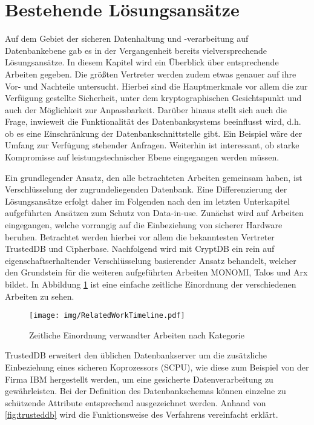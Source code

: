 \section{Bestehende Lösungsansätze}

Auf dem Gebiet der sicheren Datenhaltung und -verarbeitung auf Datenbankebene gab es in der Vergangenheit bereits vielversprechende Lösungsansätze. In diesem Kapitel wird ein Überblick über entsprechende Arbeiten gegeben. Die größten Vertreter werden zudem etwas genauer auf ihre Vor- und Nachteile untersucht. Hierbei sind die Hauptmerkmale vor allem die zur Verfügung gestellte Sicherheit, unter dem kryptographischen Gesichtspunkt und auch der Möglichkeit zur Anpassbarkeit. Darüber hinaus stellt sich auch die Frage, inwieweit die Funktionalität des Datenbanksystems beeinflusst wird, d.h. ob es eine Einschränkung der Datenbankschnittstelle gibt. Ein Beispiel wäre der Umfang zur Verfügung stehender Anfragen. Weiterhin ist interessant, ob starke Kompromisse auf leistungstechnischer Ebene eingegangen werden müssen.

Ein grundlegender Ansatz, den alle betrachteten Arbeiten gemeinsam haben, ist Verschlüsselung der zugrundeliegenden Datenbank. Eine Differenzierung der Lösungsansätze erfolgt daher im Folgenden nach den im letzten Unterkapitel aufgeführten Ansätzen zum Schutz von Data-in-use. Zunächst wird auf Arbeiten eingegangen, welche vorrangig auf die Einbeziehung von sicherer Hardware beruhen. Betrachtet werden hierbei vor allem die bekanntesten Vertreter TrustedDB und Cipherbase. Nachfolgend wird mit CryptDB ein rein auf eigenschaftserhaltender Verschlüsselung basierender Ansatz behandelt, welcher den Grundstein für die weiteren aufgeführten Arbeiten MONOMI, Talos und Arx bildet. In Abbildung \ref{fig:timeline} ist eine einfache zeitliche Einordnung der verschiedenen Arbeiten zu sehen.

\begin{figure}
	\texttt{[image: img/RelatedWorkTimeline.pdf]}
	\centering
	\caption{Zeitliche Einordnung verwandter Arbeiten nach Kategorie}
	\label{fig:timeline}
\end{figure}

TrustedDB \cite{Bajaj2013} erweitert den üblichen Datenbankserver um die zusätzliche Einbeziehung eines sicheren Koprozessors (SCPU), wie diese zum Beispiel von der Firma IBM hergestellt werden, um eine gesicherte Datenverarbeitung zu gewährleisten. Bei der Definition des Datenbankschemas können einzelne zu schützende Attribute entsprechend ausgezeichnet werden. Anhand von \ref{fig:trusteddb} wird die Funktionsweise des Verfahrens vereinfacht erklärt. 

